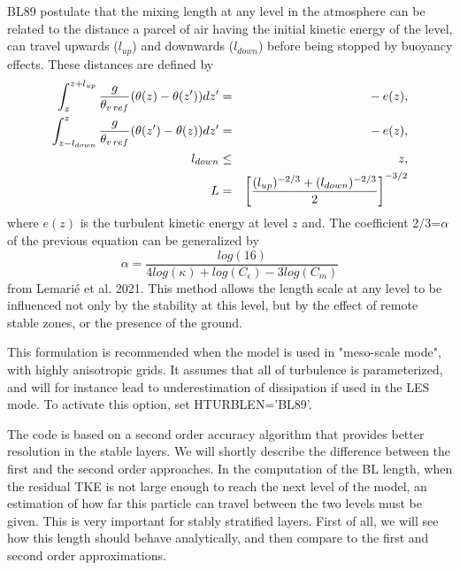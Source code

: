 BL89 postulate that the mixing length at any level in the atmosphere
can be related to the distance a parcel of air having the initial kinetic
energy of the level, can travel upwards ($l_{up}$) and downwards ($l_{down}$)
before being stopped by buoyancy effects. These distances are defined by
\begin{eqnarray}
\int_z^{z+l_{up}} {g \over \theta_{v\,ref}} (\theta(z)-\theta(z'))dz' &= &
-\: e(z), \nonumber \\
\int_{z-l_{down}}^z {g \over \theta_{v\,ref}} (\theta(z')-\theta(z))dz' &= &
-\: e(z), \label{eqBL89}\\
l_{down}&\le & z, \nonumber  \\
L&=& \left[ \frac{(l_{up})^{-2/3} + (l_{down})^{-2/3}}{2} \right]^{-3/2}
\end{eqnarray}
where $e(z)$ is the turbulent kinetic energy at level $z$ and. The coefficient 2/3=$\alpha$ of the previous equation can be generalized by
\begin{equation}
\alpha = \dfrac{log(16)}{4log(\kappa) + log(C_{\epsilon}) - 3log(C_m)}
\end{equation}
from Lemarié et al. 2021.
This method allows the length scale at any level to be influenced
not only by the stability at this level, but by the effect of remote stable
zones, or the presence of the ground.


This formulation is recommended when the model is used in "meso-scale mode",
with highly anisotropic grids. It assumes that all of turbulence is
parameterized, and will for instance lead to underestimation of dissipation
if used in the LES mode. To activate this option, set HTURBLEN='BL89'.


The code is based on a second order accuracy algorithm that provides better
resolution in the stable layers.
We will shortly describe the difference between the first and the
second order approaches.
In the computation of the BL length, when the residual TKE is not large
enough to reach the next level of the model, an estimation of how far this
particle can travel between the two levels must be given. This is very
important for stably stratified layers. First of all, we will see how
this length should behave analytically, and then compare to the first and second
order approximations.

